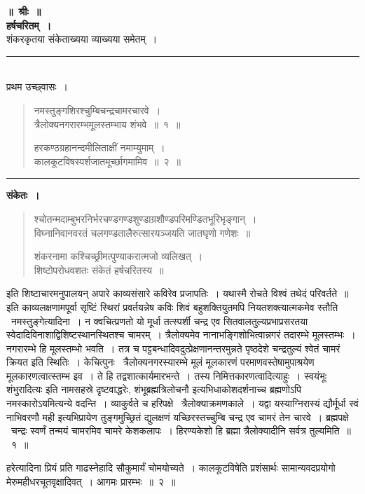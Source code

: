 \documentclass[11pt, openany]{book}
\begin{document}
\newpage
\begin{center}
\textbf{\large ॥~श्रीः~॥}\\

\textbf{\LARGE हर्षचरितम्~।}\\

{\large शंकरकृतया संकेताख्यया व्याख्यया समेतम्~।}\\

\rule{0.2\linewidth}{0.5pt}\\

{\s प्रथम उच्छ्वासः~।}
\end{center}

\begin{quote}
{\ha नमस्तुङ्गशिरश्चुम्बिचन्द्रचामरचारवे~।\\
त्रैलोक्यनगरारम्भमूलस्तम्भाय शंभवे~॥~१~॥

हरकण्ठग्रहानन्दमीलिताक्षीं नमाम्युमाम्~।\\
कालकूटविषस्पर्शजातमूर्च्छागमामिव~॥~२~॥}
\end{quote}

\hrule

\begin{center}
\textbf{संकेतः~।}
\end{center}

\begin{quote}
{\qt श्चोतन्मदाम्बुभरनिर्भरचण्डगण्डशुण्डाग्रशौण्डपरिमण्डितभूरिभृङ्गान्~।\\ 
विघ्नानिवानवरतं चलगण्डतालैरुत्सारयञ्जयति जातघृणो गणेशः~॥

शंकरनामा कश्चिच्छ्रीमत्पुण्याकरात्मजो व्यलिखत्~।\\
शिष्टोपरोधवशतः संकेतं हर्षचरितस्य~॥}
\end{quote}

\setlength{\parskip}{1em}

{ इति शिष्टाचारमनुपालयन् {\qt अपारे काव्यसंसारे कविरेव प्रजापतिः~। यथास्मै रोचते विश्वं तथेदं परिवर्तते~॥} इति काव्यलक्षणामपूर्वा सृष्टिं स्थिरां प्रवर्तयन्नेष कविः शिवं बहुशक्तियुतमपि नियतशक्त्यात्मकमेव स्तौति \textendash\ {\qtt नमस्तुङ्गेत्यादिना}~। न क्वचित्प्रणतो यो मूर्धा तत्स्पर्शी चन्द्र एव सितवालतुल्यप्रभाप्रसरतया स्वेदादिविनाशाद्विशिष्टस्थानस्थितश्च चामरम्~। त्रैलोक्यमेव नानाभङ्गिशोभित्वान्नगरं तदारम्भे मूलस्तम्भः~। नगरारम्भे हि मूलस्तम्भो भवति~। तत्र च पट्टबन्धादिवदुत्प्रेक्षणानन्तरमुन्नते पृष्ठदेशे चन्द्रतुल्यं श्वेतं चामरं क्रियत इति स्थितिः~। केचित्पुनः \textendash\ त्रैलोक्यनगरस्यारम्भे मूलं मूलकारणं परमाणवस्तेषामुपाश्रयेण मूलकारणत्वात्स्तम्भ इव~। ते हि तद्वशात्कार्यमारभन्ते~। तस्य निमित्तकारणत्वादित्याहुः~। {\qt स्वयंभूः शंभुरादित्यः} इति नामसहस्रे दृष्टवाद्धरेः, {\qt शंभूब्रह्मत्रिलोचनौ} इत्यभिधाकोशदर्शनाच्च ब्रह्मणोऽपि नमस्कारोऽयमित्यन्ये वदन्ति~। व्याकुर्वते च हरिपक्षे \textendash\ त्रैलोक्याक्रमणकाले~। यद्वा {\qt यस्याग्निरास्यं द्यौर्मूर्धा स्वं नाभिवरणौ मही} इत्यभिप्रायेण तुङ्गमुच्छ्रितं द्युलक्षणं यच्छिरस्तच्चुम्बि चन्द्र एव चामरं तेन चारवे~। ब्रह्मपक्षे \textendash\ चन्द्रः स्वर्णं तन्मयं चामरमिव चामरे केशकलापः~। हिरण्यकेशो हि ब्रह्मा त्रैलोक्यादीनि सर्वत्र तुल्यमिति~॥~१~॥

{\qtt हरेत्यादिना} प्रियं प्रति गाढस्नेहादि सौकुमार्यं चोमयोच्यते~। कालकूटविषेति प्रशंसार्थः सामान्यवदप्रयोगो मेरुमहीधरचूतवृक्षादिवत्~। आगमः प्रारम्भः~॥~२~॥}
\end{document}
